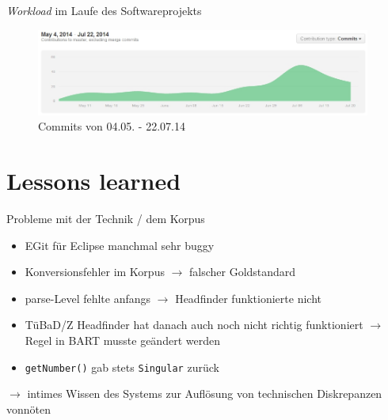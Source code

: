 \documentclass[11pt,a4paper]{beamer}
\begin{document}
\begin{frame}

    \begin{gantt}{10}{9}
    \begin{ganttitle}
    \end{ganttitle}
    \begin{ganttitle}
    \end{ganttitle}
  \end{gantt}
  
\end{frame}

\begin{frame}{\textit{Workload} im Laufe des Softwareprojekts}
\begin{figure}
\begin{center}
\includegraphics[width=11cm]{contributions_to_master.jpg}
\caption{Commits von 04.05. - 22.07.14}
\label{fig:contributions}
\end{center}
\end{figure}
\end{frame}


\section{Lessons learned}
\begin{frame}{Probleme mit der Technik / dem Korpus}
\begin{itemize}
\item EGit für Eclipse manchmal sehr buggy
\item Konversionsfehler im Korpus $\rightarrow$ falscher Goldstandard
\item parse-Level fehlte anfangs $\rightarrow$ Headfinder funktionierte nicht
\item TüBaD/Z Headfinder hat danach auch noch nicht richtig funktioniert $\rightarrow$ Regel in BART musste geändert werden
\item \texttt{getNumber()} gab stets \texttt{Singular} zurück 
\end{itemize}
$\rightarrow$ intimes Wissen des Systems zur Auflösung von technischen Diskrepanzen vonnöten

\end{frame}
\end{document}
